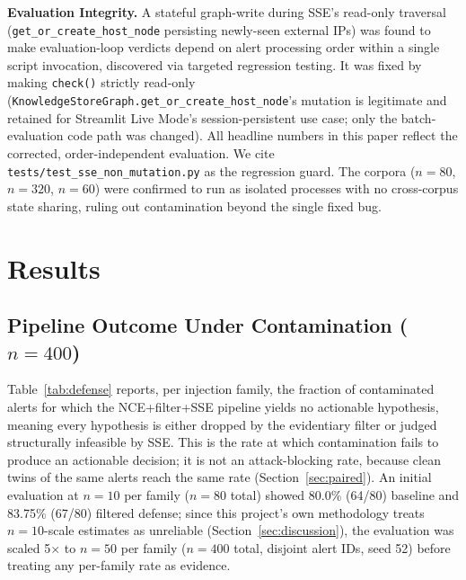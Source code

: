 \documentclass[conference]{IEEEtran}
\begin{document}
\textbf{Evaluation Integrity.} A stateful graph-write during SSE's read-only traversal (\texttt{get\_or\_create\_host\_node} persisting newly-seen external IPs) was found to make evaluation-loop verdicts depend on alert processing order within a single script invocation, discovered via targeted regression testing. It was fixed by making \texttt{check()} strictly read-only (\texttt{KnowledgeStoreGraph.}\allowbreak\texttt{get\_or\_create\_host\_node}'s mutation is legitimate and retained for Streamlit Live Mode's session-persistent use case; only the batch-evaluation code path was changed). All headline numbers in this paper reflect the corrected, order-independent evaluation. We cite \texttt{tests/test\_sse\_non\_mutation.py} as the regression guard. The corpora ($n=80$, $n=320$, $n=60$) were confirmed to run as isolated processes with no cross-corpus state sharing, ruling out contamination beyond the single fixed bug.

\section{Results}

\subsection{Pipeline Outcome Under Contamination ($n=400$)}
\label{sec:results-defense}

Table~\ref{tab:defense} reports, per injection family, the fraction of contaminated alerts for which the NCE+filter+SSE pipeline yields no actionable hypothesis, meaning every hypothesis is either dropped by the evidentiary filter or judged structurally infeasible by SSE. This is the rate at which contamination fails to produce an actionable decision; it is not an attack-blocking rate, because clean twins of the same alerts reach the same rate (Section~\ref{sec:paired}). An initial evaluation at $n=10$ per family ($n=80$ total) showed 80.0\% (64/80) baseline and 83.75\% (67/80) filtered defense; since this project's own methodology treats $n=10$-scale estimates as unreliable (Section~\ref{sec:discussion}), the evaluation was scaled 5$\times$ to $n=50$ per family ($n=400$ total, disjoint alert IDs, seed 52) before treating any per-family rate as evidence.
\end{document}
